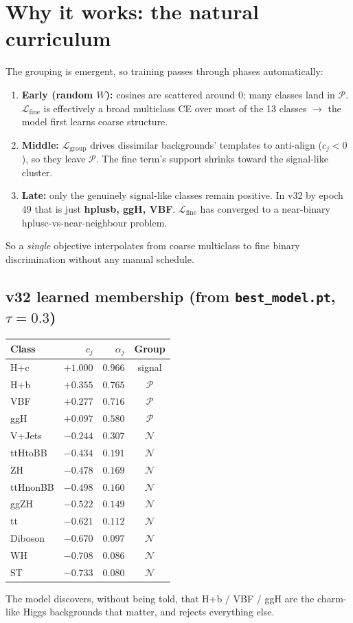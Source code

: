 \documentclass[11pt]{article}
\newcommand{\Pset}{\mathcal{P}}
\newcommand{\Nset}{\mathcal{N}}
\begin{document}
\section{Why it works: the natural curriculum}
The grouping is emergent, so training passes through phases automatically:
\begin{enumerate}[nosep]
  \item \textbf{Early (random $W$):} cosines are scattered around $0$; many classes land in
        $\Pset$. $\mathcal{L}_\text{fine}$ is effectively a broad multiclass CE over most of the
        13 classes $\to$ the model first learns coarse structure.
  \item \textbf{Middle:} $\mathcal{L}_\text{group}$ drives dissimilar backgrounds' templates to
        anti-align ($c_j < 0$), so they leave $\Pset$. The fine term's support shrinks toward the
        signal-like cluster.
  \item \textbf{Late:} only the genuinely signal-like classes remain positive. In v32 by epoch 49
        that is just \textbf{hplusb, ggH, VBF}. $\mathcal{L}_\text{fine}$ has converged to a
        near-binary hplusc-vs-near-neighbour problem.
\end{enumerate}
So a \emph{single} objective interpolates from coarse multiclass to fine binary discrimination
without any manual schedule.

\subsection{v32 learned membership (from \texttt{best\_model.pt}, $\tau=0.3$)}
\begin{center}
\renewcommand{\arraystretch}{1.15}
\begin{tabular}{@{}l r r c@{}}
\toprule
\textbf{Class} & $c_j$ & $\alpha_j$ & \textbf{Group} \\
\midrule
H+c      & $+1.000$ & $0.966$ & signal \\
H+b      & $+0.355$ & $0.765$ & $\Pset$ \\
VBF      & $+0.277$ & $0.716$ & $\Pset$ \\
ggH      & $+0.097$ & $0.580$ & $\Pset$ \\
V+Jets   & $-0.244$ & $0.307$ & $\Nset$ \\
ttHtoBB  & $-0.434$ & $0.191$ & $\Nset$ \\
ZH       & $-0.478$ & $0.169$ & $\Nset$ \\
ttHnonBB & $-0.498$ & $0.160$ & $\Nset$ \\
ggZH     & $-0.522$ & $0.149$ & $\Nset$ \\
tt       & $-0.621$ & $0.112$ & $\Nset$ \\
Diboson  & $-0.670$ & $0.097$ & $\Nset$ \\
WH       & $-0.708$ & $0.086$ & $\Nset$ \\
ST       & $-0.733$ & $0.080$ & $\Nset$ \\
\bottomrule
\end{tabular}
\end{center}
The model discovers, without being told, that H+b / VBF / ggH are the charm-like Higgs
backgrounds that matter, and rejects everything else.
\end{document}
